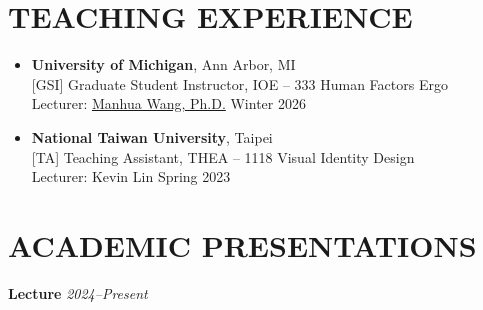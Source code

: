 \documentclass[11pt]{article}
\begin{document}
\section*{TEACHING EXPERIENCE}
\begin{itemize}[leftmargin=*, topsep=0pt, itemsep=6pt]

  \item \textbf{University of Michigan}, Ann Arbor, MI\\
  {[GSI]} Graduate Student Instructor, IOE – 333 Human Factors Ergo \\ Lecturer: \href{https://ioe.engin.umich.edu/people/manhua-wang/}{Manhua Wang, Ph.D.} \hfill Winter 2026

  \item \textbf{National Taiwan University}, Taipei\\
  {[TA]} Teaching Assistant, THEA – 1118 Visual Identity Design \\ Lecturer: Kevin Lin \hfill Spring 2023

\end{itemize}

\vspace{0.6em}

\section*{ACADEMIC PRESENTATIONS}


\textbf{Lecture} \hfill \textit{2024--Present}

\vspace{0.4em}
\end{document}

